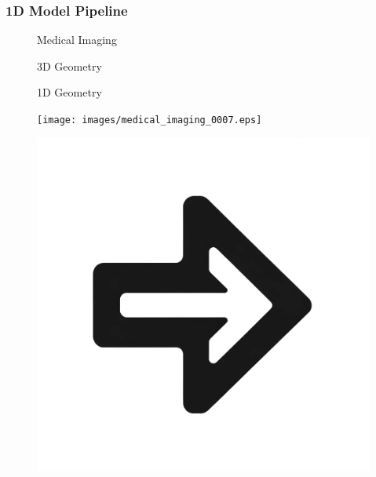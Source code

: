 \documentclass{beamer}
\begin{document}
\begin{frame}
	\frametitle{1D Model Pipeline}
	\vspace{-16pt}
	\begin{figure}[htbp]
		\begin{minipage}[t][0.06\paperheight][t]{\linewidth}
			\begin{minipage}{0.19\linewidth}
				\caption*{\tiny Medical Imaging}
			\end{minipage}
			\begin{minipage}{0.1\linewidth}
				\caption*{\tiny}
			\end{minipage}
			\begin{minipage}{0.19\linewidth}
				\caption*{\tiny 3D Geometry}
			\end{minipage}
			\begin{minipage}{0.1\linewidth}
				\caption*{\tiny}
			\end{minipage}
			\begin{minipage}{0.19\linewidth}
				\caption*{\tiny 1D Geometry}
			\end{minipage}
			\begin{minipage}{0.1\linewidth}
				\caption*{\tiny}
			\end{minipage}
		\end{minipage}
		\begin{minipage}[c][0.35\paperheight][c]{\linewidth}
			\begin{minipage}{0.19\linewidth}
				\texttt{[image: images/medical\_imaging\_0007.eps]}
			\end{minipage}
			\begin{minipage}{0.1\linewidth}
				\includegraphics[width=\linewidth]{images/right_arrow.png}

\end{minipage}
\end{minipage}
\end{figure}
\end{frame}
\end{document}
